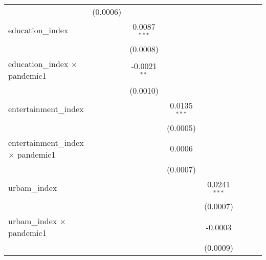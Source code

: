 \begin{table}[htbp]
\begin{tabular}{lccccccc}
                                                 & (0.0006)       &                &                &                &                &                        &   \\   
      education\_index                           &                & 0.0087$^{***}$ &                &                &                &                        &   \\   
                                                 &                & (0.0008)       &                &                &                &                        &   \\   
      education\_index $\times$ pandemic1        &                & -0.0021$^{**}$ &                &                &                &                        &   \\   
                                                 &                & (0.0010)       &                &                &                &                        &   \\   
      entertainment\_index                       &                &                & 0.0135$^{***}$ &                &                &                        &   \\   
                                                 &                &                & (0.0005)       &                &                &                        &   \\   
      entertainment\_index $\times$ pandemic1    &                &                & 0.0006         &                &                &                        &   \\   
                                                 &                &                & (0.0007)       &                &                &                        &   \\   
      urbam\_index                               &                &                &                & 0.0241$^{***}$ &                &                        &   \\   
                                                 &                &                &                & (0.0007)       &                &                        &   \\   
      urbam\_index $\times$ pandemic1            &                &                &                & -0.0003        &                &                        &   \\   
                                                 &                &                &                & (0.0009)       &                &                        &   \\   

\end{tabular}
\end{table}

